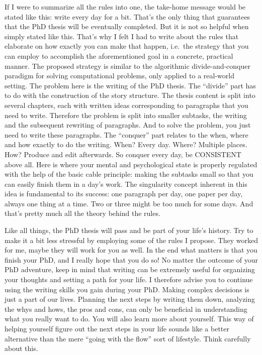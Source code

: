 \documentclass[
  12pt,
  oneside]{book}
\begin{document}
If I were to summarize all the rules into one, the take-home message would be stated like this: write every day for a bit.
That's the only thing that guarantees that the PhD thesis will be eventually completed.
But it is not so helpful when simply stated like this.
That's why I felt I had to write about the rules that elaborate on how exactly you can make that happen, i.e.~the strategy that you can employ to accomplish the aforementioned goal in a concrete, practical manner.
The proposed strategy is similar to the algorithmic divide-and-conquer paradigm for solving computational problems, only applied to a real-world setting.
The problem here is the writing of the PhD thesis.
The ``divide'' part has to do with the construction of the story structure.
The thesis content is split into several chapters, each with written ideas corresponding to paragraphs that you need to write.
Therefore the problem is split into smaller subtasks, the writing and the subsequent rewriting of paragraphs.
And to solve the problem, you just need to write these paragraphs.
The ``conquer'' part relates to the when, where and how exactly to do the writing.
When? Every day.
Where? Multiple places.
How? Produce and edit afterwards.
So conquer every day, be CONSISTENT above all.
Here is where your mental and psychological state is properly regulated with the help of the basic cable principle: making the subtasks small so that you can easily finish them in a day's work.
The singularity concept inherent in this idea is fundamental to its success: one paragraph per day, one paper per day, always one thing at a time.
Two or three might be too much for some days.
And that's pretty much all the theory behind the rules.

Like all things, the PhD thesis will pass and be part of your life's history.
Try to make it a bit less stressful by employing some of the rules I propose.
They worked for me, maybe they will work for you as well.
In the end what matters is that you finish your PhD, and I really hope that you do so! No matter the outcome of your PhD adventure, keep in mind that writing can be extremely useful for organizing your thoughts and setting a path for your life.
I therefore advise you to continue using the writing skills you gain during your PhD.
Making complex decisions is just a part of our lives.
Planning the next steps by writing them down, analyzing the whys and hows, the pros and cons, can only be beneficial in understanding what you really want to do.
You will also learn more about yourself.
This way of helping yourself figure out the next steps in your life sounds like a better alternative than the mere ``going with the flow'' sort of lifestyle.
Think carefully about this.
\end{document}
